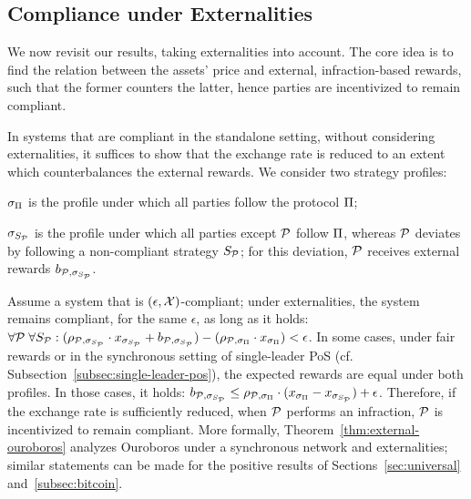 \subsection{Compliance under Externalities}

We now revisit our results, taking externalities into account. The core idea is
to find the relation between the assets' price and external, infraction-based
rewards, such that the former counters the latter, hence parties are
incentivized to remain compliant.

In systems that are compliant in the standalone setting, \ie without
considering externalities, it suffices to show that the exchange rate is
reduced to an extent which counterbalances the external rewards. We consider
two strategy profiles:
\begin{inparaenum}[i)]
    \item $\sigma_\Pi$ is the profile under which all parties follow the
        protocol $\Pi$;
    \item $\sigma_{S_{\mathcal{P}}}$ is the profile under which all parties except
        $\mathcal{P}$ follow $\Pi$, whereas $\mathcal{P}$ deviates by following a non-compliant strategy $S_{\mathcal{P}}$; for this
        deviation, $\mathcal{P}$ receives external rewards
        $b_{\mathcal{P}, \sigma_{S_{\mathcal{P}}}}$.
\end{inparaenum}
Assume a system that is $(\epsilon, \mathcal{X})$-compliant; under
externalities, the system remains compliant, for the same $\epsilon$, as long
as it holds:
$\forall \mathcal{P} \; \forall S_{\mathcal{P}}: (\rho_{\mathcal{P}, \sigma_{S_{\mathcal{P}}}} \cdot x_{\sigma_{S_{\mathcal{P}}}} + b_{\mathcal{P}, \sigma_{S_{\mathcal{P}}}}) - (\rho_{\mathcal{P}, \sigma_\Pi} \cdot x_{\sigma_\Pi}) < \epsilon$.
In some cases, \eg under fair rewards or in the synchronous setting of
single-leader PoS (cf. Subsection~\ref{subsec:single-leader-pos}), the expected
rewards are equal under both profiles. In those cases, it holds:
$b_{\mathcal{P}, \sigma_{S_{\mathcal{P}}}} \leq \rho_{\mathcal{P}, \sigma_\Pi} \cdot (x_{\sigma_\Pi} - x_{\sigma_{S_{\mathcal{P}}}}) + \epsilon$.
Therefore, if the exchange rate is sufficiently reduced, when $\mathcal{P}$ performs
an infraction, $\mathcal{P}$ is incentivized to remain compliant. More formally,
Theorem~\ref{thm:external-ouroboros} analyzes Ouroboros under a synchronous
network and externalities; similar statements can be made for the positive
results of Sections~\ref{sec:universal} and~\ref{subsec:bitcoin}.

